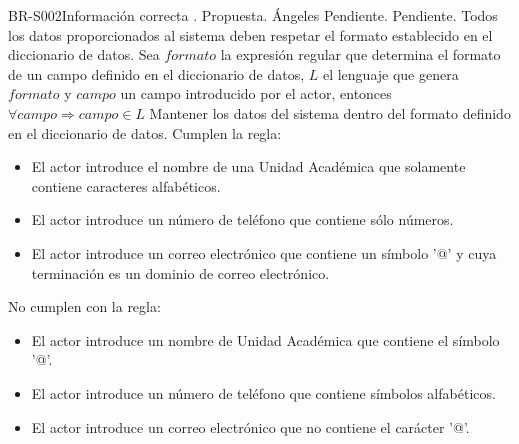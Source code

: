 \begin{BusinessRule}{BR-S002}{Información correcta}
	{\bcIntegridad}    %
	{\btEnabler}     %
	{\blControlling}    %
	.
	\BRItem[Estado] Propuesta.
	 Ángeles
	 Pendiente.
	 Pendiente.
	\BRItem[Descripción] Todos los datos proporcionados al sistema deben respetar el formato establecido en el diccionario de datos.
	\BRItem[Sentencia] Sea $formato$ la expresión regular que determina el formato de un campo definido en el diccionario de datos, $L$ el lenguaje que genera $formato$ y $campo$ un campo introducido por el actor, entonces
	$ \forall campo \Rightarrow campo \in L $
	\BRItem[Motivación] Mantener los datos del sistema dentro del formato definido en el diccionario de datos.
	 Cumplen la regla:
	\begin{itemize}
		\item El actor introduce el nombre de una Unidad Académica que solamente contiene caracteres alfabéticos.
		\item El actor introduce un número de teléfono que contiene sólo números.
		\item El actor introduce un correo electrónico que contiene un símbolo '@' y cuya terminación es un dominio de correo electrónico.
	\end{itemize}
	 No cumplen con la regla:
	\begin{itemize}
		\item El actor introduce un nombre de Unidad Académica que contiene el símbolo '@'.
		\item El actor introduce un número de teléfono que contiene símbolos alfabéticos.
		\item El actor introduce un correo electrónico que no contiene el carácter '@'.
	\end{itemize}
\end{BusinessRule}

